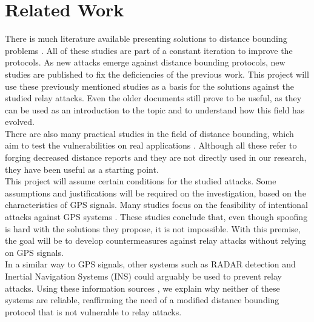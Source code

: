 \documentclass{article}
\begin{document}
\section{Related Work}
\label{sec:relatedwork}

There is much literature available presenting solutions to distance bounding problems \cite{brands1994distance, rasmussen2010realization, tu2007rfid}. All of these studies are part of a constant iteration to improve the protocols. As new attacks emerge against distance bounding protocols, new studies are published to fix the deficiencies of the previous work. This project will use these previously mentioned studies as a basis for the solutions against the studied relay attacks. Even the older documents still prove to be useful, as they can be used as an introduction to the topic and to understand how this field has evolved.\\

There are also many practical studies in the field of distance bounding, which aim to test the vulnerabilities on real applications \cite{vandenbreekel2014relay, francillon2011relay, francis2010practical, hancke2005practical, markantonakis2012practical}. Although all these refer to forging decreased distance reports and they are not directly used in our research, they have been useful as a starting point.\\

This project will assume certain conditions for the studied attacks. Some assumptions and justifications will be required on the investigation, based on the characteristics of GPS signals. Many studies focus on the feasibility of intentional attacks against GPS systems \cite{jafarnia2012gps, warner2003gps, wen2005countermeasures}. These studies conclude that, even though spoofing is hard with the solutions they propose, it is not impossible. With this premise, the goal will be to develop countermeasures against relay attacks without relying on GPS signals.\\

In a similar way to GPS signals, other systems such as RADAR detection \cite{cadirci2009rf} and Inertial Navigation Systems (INS) \cite{patent:4085440} could arguably be used to prevent relay attacks. Using these information sources \cite{cadirci2009rf, patent:4085440}, we explain why neither of these systems are reliable, reaffirming the need of a modified distance bounding protocol that is not vulnerable to relay attacks.\\
\end{document}
